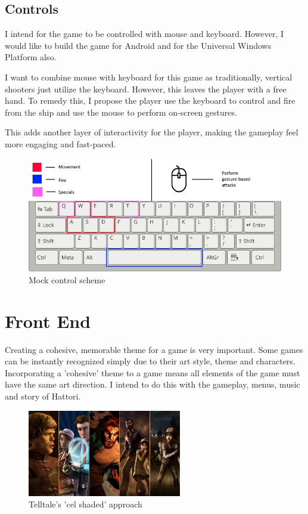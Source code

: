 \documentclass[a4paper]{scrreprt}
\begin{document}
\clearpage
\section{Controls}
I intend for the game to be controlled with mouse and keyboard. However, I would like to build the game for Android and for the Universal Windows Platform also.

I want to combine mouse with keyboard for this game as traditionally, vertical shooters just utilize the keyboard. However, this leaves the player with a free hand. To remedy this, I propose the player use the keyboard to control and fire from the ship and use the mouse to perform on-screen gestures.

This adds another layer of interactivity for the player, making the gameplay feel more engaging and fast-paced.

\begin{figure}[h]
  \centering
  \includegraphics[width=1\textwidth]{Controls}
  \caption{Mock control scheme}
  \end{figure}




\chapter{Front End}
Creating a cohesive, memorable theme for a game is very important. Some games can be instantly recognized simply due to their art style, theme and characters. Incorporating a 'cohesive' theme to a game means all elements of the game must have the same art direction. I intend to do this with the gameplay, menus, music and story of Hattori.
\begin{figure}[h]
  \centering
  \includegraphics[width=0.6\textwidth]{Telltale}
  \caption{Telltale's 'cel shaded' approach}
  \end{figure}
\end{document}
